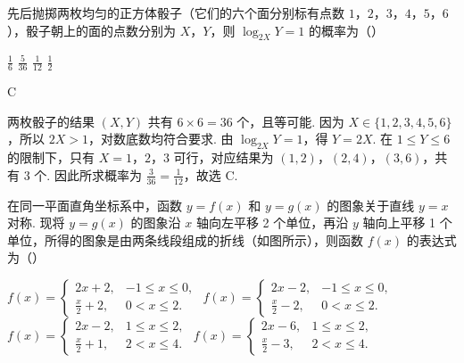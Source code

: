 \begin{problem}
先后抛掷两枚均匀的正方体骰子（它们的六个面分别标有点数 \(1\)，\(2\)，\(3\)，\(4\)，\(5\)，\(6\)），骰子朝上的面的点数分别为 \(X\)，\(Y\)，则 \(\log_{2X}Y = 1\) 的概率为（\quad）

\choices
    {\(\frac{1}{6}\)}
    {\(\frac{5}{36}\)}
    {\(\frac{1}{12}\)}
    {\(\frac{1}{2}\)}
\end{problem}

\begin{answer}
C
\end{answer}

\begin{solution}
两枚骰子的结果 \((X,Y)\) 共有 \(6\times6=36\) 个，且等可能. 因为 \(X\in\{1,2,3,4,5,6\}\)，所以 \(2X>1\)，对数底数均符合要求. 由 \(\log_{2X}Y=1\)，得 \(Y=2X\). 在 \(1\leqslant Y\leqslant6\) 的限制下，只有 \(X=1\)，\(2\)，\(3\) 可行，对应结果为 \((1,2)\)，\((2,4)\)，\((3,6)\)，共有 \(3\) 个. 因此所求概率为 \(\frac{3}{36}=\frac{1}{12}\)，故选 C.
\end{solution}

\begin{problem}
在同一平面直角坐标系中，函数 \(y = f(x)\) 和 \(y = g(x)\) 的图象关于直线 \(y = x\) 对称. 现将 \(y = g(x)\) 的图象沿 \(x\) 轴向左平移 2 个单位，再沿 \(y\) 轴向上平移 1 个单位，所得的图象是由两条线段组成的折线（如图所示），则函数 \(f(x)\) 的表达式为（\quad）


\choices
    {\(f(x) = \begin{cases}
2x + 2, & -1\leqslant x\leqslant 0,\\
\frac{x}{2} +2, & 0 < x\leqslant 2.
\end{cases}\)}
    {\(f(x) = \begin{cases}
2x - 2, & -1\leqslant x\leqslant 0,\\
\frac{x}{2} -2, & 0 < x\leqslant 2.
\end{cases}\)}
    {\(f(x) = \begin{cases}
2x - 2, & 1\leqslant x\leqslant 2,\\
\frac{x}{2} +1, & 2 < x\leqslant 4.
\end{cases}\)}
    {\(f(x) = \begin{cases}
2x - 6, & 1\leqslant x\leqslant 2,\\
\frac{x}{2} -3, & 2 < x\leqslant 4.
\end{cases}\)}
\end{problem}

